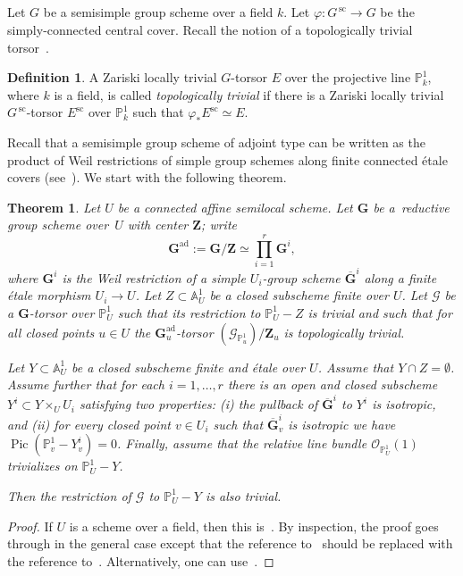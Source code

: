 \documentclass[11pt]{amsart}
\renewcommand{\phi}{\varphi}
\newcommand\A{\mathbb A}
\renewcommand\P{\mathbb P}
\DeclareMathOperator\Pic{{Pic}}
\DeclareMathOperator{\ad}{ad}
\renewcommand{\sc}{\mathrm{sc}}
\theoremstyle{plain}
\newtheorem{theorem}{Theorem}
\theoremstyle{definition}
\newtheorem{definition}[proposition]{Definition}
\theoremstyle{remark}
\newcommand\cG{{\mathcal{G}}}
\newcommand\cO{{\mathcal{O}}}
\newcommand\bG{{\mathbf G}}
\newcommand\bZ{{\mathbf Z}}
\begin{document}
\subsection{} Let $G$ be a semisimple group scheme over a field $k$. Let $\phi\colon G^{\,\sc}\to G$ be the simply-connected central cover. Recall the notion of a topologically trivial torsor~\cite[Def.~2.1]{FedorovGrSerreNonSC}.

\begin{definition}
A Zariski locally trivial $G$-torsor $E$ over the projective line $\P^1_k$, where $k$ is a field, is called \emph{topologically trivial\/} if there is a Zariski locally trivial $G^{\,\sc}$-torsor $E^{\sc}$ over $\P^1_k$ such that $\phi_*E^{\sc}\simeq E$.
\end{definition}

Recall that a semisimple group scheme of adjoint type can be written as the product of Weil restrictions of simple group schemes along finite connected \'etale covers (see~\cite[exp.~XXIV, prop.~5.10]{SGA3-3}). We start with the following theorem.

\begin{theorem}\label{th:MainThm2}
Let $U$ be a connected affine semilocal scheme. Let $\bG$ be a~reductive group scheme over~$U$ with center $\bZ$; write
\[
    \bG^{\ad}:=\bG/\bZ\simeq\prod_{i=1}^r\bG^i,
\]
where $\bG^i$ is the Weil restriction of a simple $U_i$-group scheme $\overline\bG^i$ along a finite \'etale morphism $U_i\to U$. Let $Z\subset\A^1_U$ be a closed subscheme finite over $U$. Let $\cG$ be a $\bG$-torsor over $\P^1_U$ such that its restriction to $\P^1_U-Z$ is trivial and such that for all closed points $u\in U$ the $\bG_u^{\ad}$-torsor $(\cG_{\P^1_u})/\bZ_u$ is topologically trivial.

Let $Y\subset\A^1_U$ be a closed subscheme finite and \'etale over $U$. Assume that $Y\cap Z=\emptyset$. Assume further that for each $i=1,\ldots,r$ there is an open and closed subscheme $Y^i\subset Y\times_UU_i$ satisfying two properties: {\rm(}i{\rm)} the pullback of $\overline\bG^i$ to $Y^i$ is isotropic, and {\rm(}ii{\rm)} for every closed point $v\in U_i$ such that $\overline\bG^i_v$ is isotropic we have $\Pic(\P^1_v-Y^i_v)=0$. Finally, assume that the relative line bundle $\cO_{\P^1_U}(1)$ trivializes on $\P^1_U-Y$.

Then the restriction of $\cG$ to $\P^1_U-Y$ is also trivial.
\end{theorem}
\begin{proof}
  If $U$ is a scheme over a field, then this is~\cite[Thm.~6]{FedorovGrSerreNonSC}. By inspection, the proof goes through in the general case except that the reference to~\cite[Prop.~2.12]{FedorovGrSerreNonSC} should be replaced with the reference to~\cite[Lm.~8.3]{CesnaviciusGrSerre}. Alternatively, one can use~\cite[Prop.~5.3.6]{CesnaviciusProblems}.
\end{proof}
\end{document}
